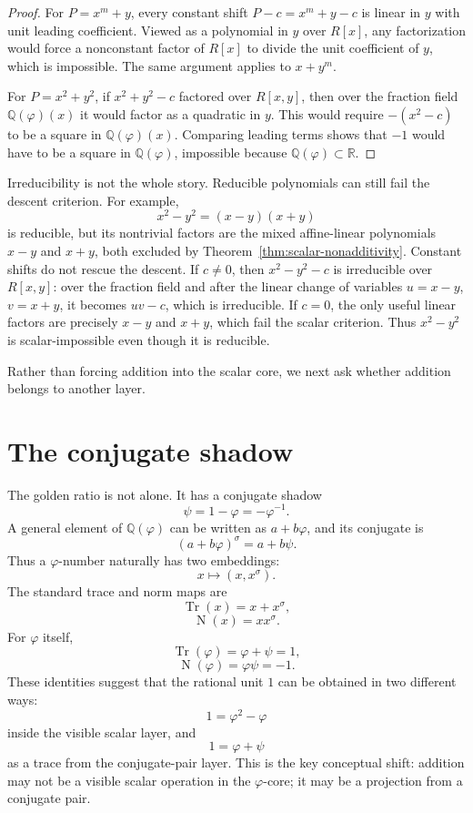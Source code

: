 \documentclass[11pt]{article}
\newcommand{\Tr}{\operatorname{Tr}}
\newcommand{\Nm}{\operatorname{N}}
\newcommand{\sig}{\sigma}
\newcommand{\ph}{\varphi}
\newcommand{\ps}{\psi}
\newcommand{\Q}{\mathbb{Q}}
\newcommand{\R}{\mathbb{R}}
\begin{document}
\begin{proof}
For $P=x^m+y$, every constant shift $P-c=x^m+y-c$ is linear in $y$ with unit leading coefficient.  Viewed as a polynomial in $y$ over $R[x]$, any factorization would force a nonconstant factor of $R[x]$ to divide the unit coefficient of $y$, which is impossible.  The same argument applies to $x+y^m$.

For $P=x^2+y^2$, if $x^2+y^2-c$ factored over $R[x,y]$, then over the fraction field $\Q(\ph)(x)$ it would factor as a quadratic in $y$.  This would require $-(x^2-c)$ to be a square in $\Q(\ph)(x)$.  Comparing leading terms shows that $-1$ would have to be a square in $\Q(\ph)$, impossible because $\Q(\ph)\subset\R$.
\end{proof}

Irreducibility is not the whole story.  Reducible polynomials can still fail the descent criterion.  For example,
\[
    x^2-y^2=(x-y)(x+y)
\]
is reducible, but its nontrivial factors are the mixed affine-linear polynomials $x-y$ and $x+y$, both excluded by Theorem~\ref{thm:scalar-nonadditivity}.  Constant shifts do not rescue the descent.  If $c\ne0$, then $x^2-y^2-c$ is irreducible over $R[x,y]$: over the fraction field and after the linear change of variables $u=x-y$, $v=x+y$, it becomes $uv-c$, which is irreducible.  If $c=0$, the only useful linear factors are precisely $x-y$ and $x+y$, which fail the scalar criterion.  Thus $x^2-y^2$ is scalar-impossible even though it is reducible.

Rather than forcing addition into the scalar core, we next ask whether addition belongs to another layer.

\section{The conjugate shadow}

The golden ratio is not alone.  It has a conjugate shadow
\[
    \ps=1-\ph=-\ph^{-1}.
\]
A general element of $\Q(\ph)$ can be written as $a+b\ph$, and its conjugate is
\[
    (a+b\ph)^\sig=a+b\ps.
\]
Thus a $\ph$-number naturally has two embeddings:
\[
    x\longmapsto (x,x^\sig).
\]
The standard trace and norm maps are
\[
    \Tr(x)=x+x^\sig,
\]
\[
    \Nm(x)=xx^\sig.
\]
For $\ph$ itself,
\[
    \Tr(\ph)=\ph+\ps=1,
\]
\[
    \Nm(\ph)=\ph\ps=-1.
\]
These identities suggest that the rational unit $1$ can be obtained in two different ways:
\[
    1=\ph^2-\ph
\]
inside the visible scalar layer, and
\[
    1=\ph+\ps
\]
as a trace from the conjugate-pair layer.  This is the key conceptual shift: addition may not be a visible scalar operation in the $\ph$-core; it may be a projection from a conjugate pair.
\end{document}
